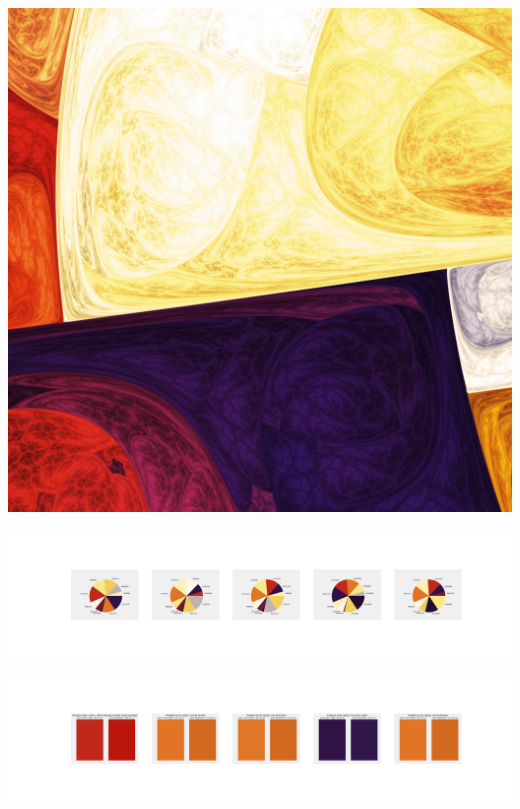 \documentclass[11pt]{article}
\begin{document}
\begin{landscape}
    \begin{center}
    \includegraphics[width=\textwidth]{./nbimg/file (274).jpg}
    \end{center}

    \begin{center}
    \includegraphics[width=250mm]{./nbimg/pie-194.jpg}
    \end{center}

    \begin{center}
    \includegraphics[width=250mm]{./nbimg/peak-194.jpg}
    \end{center}
    


\end{landscape}
\end{document}
